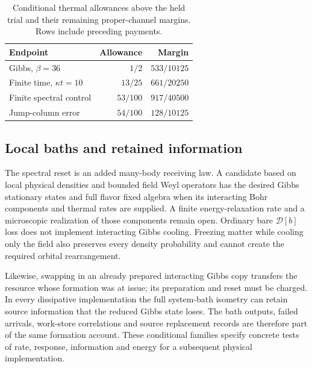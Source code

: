 \begin{table}[htbp]
\centering\small
\caption{Conditional thermal allowances above the held trial and their
remaining proper-channel margins. Rows include preceding payments.}
\begin{tabular}{lrr}\toprule
Endpoint & Allowance & Margin\\\midrule
Gibbs, $\beta=36$ & $1/2$ & $533/10125$\\
Finite time, $\kappa t=10$ & $13/25$ & $661/20250$\\
Finite spectral control & $53/100$ & $917/40500$\\
Jump-column error & $54/100$ & $128/10125$\\\bottomrule
\end{tabular}
\label{tab:thermal-budgets-new}
\end{table}

\subsection{Local baths and retained information}

The spectral reset is an added many-body receiving law. A candidate based
on local physical densities and bounded field Weyl operators has the desired
Gibbs stationary states and full flavor fixed algebra when its interacting
Bohr components and thermal rates are supplied. A finite energy-relaxation
rate and a microscopic realization of those components remain open.
Ordinary bare $\mathcal D[b]$ loss does not implement interacting Gibbs
cooling. Freezing matter while cooling only the field also preserves every
density probability and cannot create the required orbital rearrangement.

Likewise, swapping in an already prepared interacting Gibbs copy transfers
the resource whose formation was at issue; its preparation and reset must
be charged. In every dissipative implementation the full system-bath
isometry can retain source information that the reduced Gibbs state loses.
The bath outputs, failed arrivals, work-store correlations and source
replacement records are therefore part of the same formation account.
These conditional families specify concrete tests of rate, response,
information and energy for a subsequent physical implementation.
